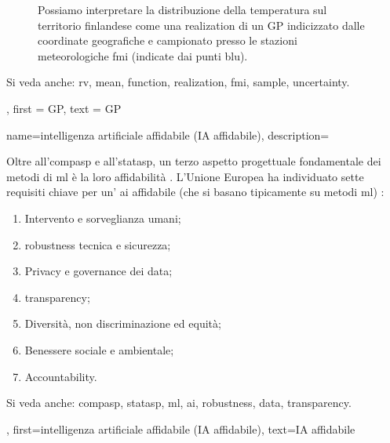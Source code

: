 {{\begin{figure}[H]
\begin{center}
\vspace*{-15mm}
\end{center}
\caption{Possiamo interpretare la distribuzione della temperatura sul territorio finlandese come una 
	\gls{realization} di un GP indicizzato dalle coordinate geografiche e campionato presso le stazioni 
	meteorologiche \gls{fmi} (indicate dai punti blu). \label{fig_gp_FMI_dict}}
\end{figure}
Si veda anche: \gls{rv}, \gls{mean}, \gls{function}, \gls{realization}, \gls{fmi}, \gls{sample}, \gls{uncertainty}.}, 
first = {GP}, 
text = {GP}
}


{name={intelligenza artificiale affidabile (IA affidabile)},
	description={Oltre all'\gls{compasp} e all'\gls{statasp}, un terzo aspetto progettuale fondamentale dei 
	metodi di \gls{ml} è la loro affidabilità \cite{pfau2024engineeringtrustworthyaideveloper}. 
		L’Unione Europea ha individuato sette requisiti chiave  per un'
		\gls{ai} affidabile (che si basano tipicamente su metodi \gls{ml}) \cite{ALTAIEU}: 
	\begin{enumerate}[label=\arabic*)]
		\item Intervento e sorveglianza umani;
		\item \Gls{robustness} tecnica e sicurezza;
		\item Privacy e governance dei \gls{data};
		\item \Gls{transparency};
		\item Diversità, non discriminazione ed equità;
		\item Benessere sociale e ambientale;
		\item Accountability. 
	\end{enumerate}
		Si veda anche: \gls{compasp}, \gls{statasp}, \gls{ml}, \gls{ai}, \gls{robustness}, \gls{data}, \gls{transparency}.},
	first={intelligenza artificiale affidabile (IA affidabile)},
	text={IA affidabile}
}

